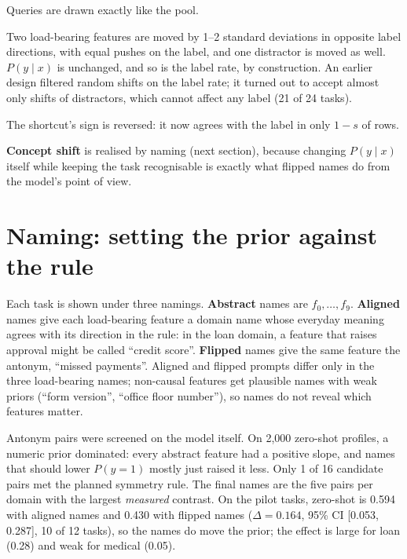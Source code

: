 \begin{description}[leftmargin=1.5em, style=nextline]
  \item[In distribution (ID)] Queries are drawn exactly like the pool.
  \item[Covariate shift] Two load-bearing features are moved by 1--2 standard deviations in opposite label directions, with equal pushes on the label, and one distractor is moved as well.
        $P(y \mid x)$ is unchanged, and so is the label rate, by construction.
        An earlier design filtered random shifts on the label rate; it turned out to accept almost only shifts of distractors, which cannot affect any label (21 of 24 tasks).
  \item[Spurious reversal] The shortcut's sign is reversed: it now agrees with the label in only $1-s$ of rows.
\end{description}

\textbf{Concept shift} is realised by naming (next section), because changing $P(y \mid x)$ itself while keeping the task recognisable is exactly what flipped names do from the model's point of view.

\section{Naming: setting the prior against the rule}
\label{sec:naming}

Each task is shown under three namings.
\textbf{Abstract} names are $f_0, \ldots, f_9$.
\textbf{Aligned} names give each load-bearing feature a domain name whose everyday meaning agrees with its direction in the rule: in the loan domain, a feature that raises approval might be called ``credit score''.
\textbf{Flipped} names give the same feature the antonym, ``missed payments''.
Aligned and flipped prompts differ only in the three load-bearing names; non-causal features get plausible names with weak priors (``form version'', ``office floor number''), so names do not reveal which features matter.

Antonym pairs were screened on the model itself.
On 2,000 zero-shot profiles, a numeric prior dominated: every abstract feature had a positive slope, and names that should lower $P(y = 1)$ mostly just raised it less.
Only 1 of 16 candidate pairs met the planned symmetry rule.
The final names are the five pairs per domain with the largest \emph{measured} contrast.
On the pilot tasks, zero-shot \AUROC is 0.594 with aligned names and 0.430 with flipped names ($\Delta = 0.164$, 95\% CI [0.053, 0.287], 10 of 12 tasks), so the names do move the prior; the effect is large for loan (0.28) and weak for medical (0.05).

